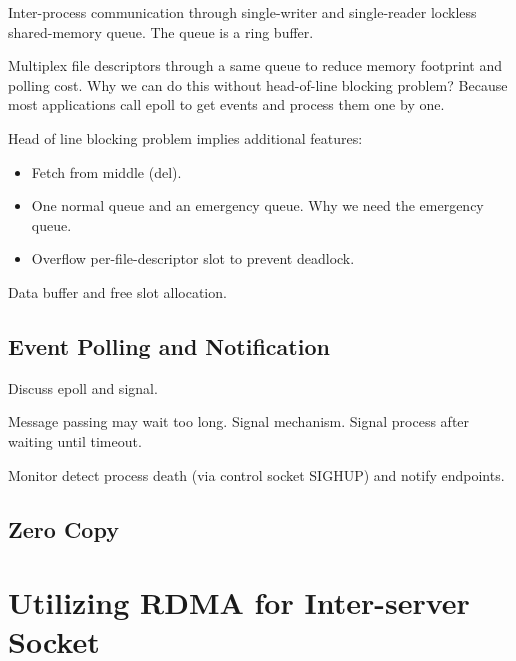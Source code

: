 Inter-process communication through single-writer and single-reader lockless shared-memory queue. The queue is a ring buffer.

Multiplex file descriptors through a same queue to reduce memory footprint and polling cost. Why we can do this without head-of-line blocking problem? Because most applications call epoll to get events and process them one by one.


Head of line blocking problem implies additional features:
\begin{itemize}
	\item Fetch from middle (del).
	\item One normal queue and an emergency queue. Why we need the emergency queue.
	\item Overflow per-file-descriptor slot to prevent deadlock.
\end{itemize}

Data buffer and free slot allocation.

\subsection{Event Polling and Notification}
\label{subsec:epoll}

Discuss epoll and signal.

Message passing may wait too long.
Signal mechanism. Signal process after waiting until timeout.

Monitor detect process death (via control socket SIGHUP) and notify endpoints.


\subsection{Zero Copy}
\label{subsec:zerocopy}



\section{Utilizing RDMA for Inter-server Socket}
\label{sec:rdma}

